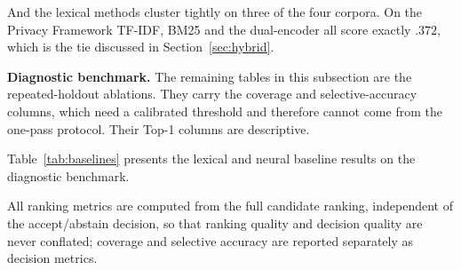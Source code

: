 \documentclass[smallextended,natbib]{svjour3}
\begin{document}
And the lexical methods cluster tightly on three of the four corpora. On the Privacy Framework TF-IDF, BM25 and the dual-encoder all score exactly $.372$, which is the tie discussed in Section~\ref{sec:hybrid}.

\noindent\textbf{Diagnostic benchmark.}
\label{sec:results-synth}
The remaining tables in this subsection are the repeated-holdout ablations. They carry the coverage and selective-accuracy columns, which need a calibrated threshold and therefore cannot come from the one-pass protocol. Their Top-1 columns are descriptive.

Table~\ref{tab:baselines} presents the lexical and neural baseline results on the diagnostic benchmark.

\begin{table}[htbp]
\caption{Baseline comparison on the diagnostic benchmark. Repeated-holdout protocol, mean $\pm$ 95\% CI over 30 seeds, 110 controls, 86 positive links. Descriptive; the cross-corpus ranking claims of Section~\ref{sec:results-multi} use the one-pass protocol instead.}
\label{tab:baselines}
\centering
\setlength{\tabcolsep}{3pt}
\small
{}
\end{table}

All ranking metrics are computed from the full candidate ranking, independent of the accept/abstain decision, so that ranking quality and decision quality are never conflated; coverage and selective accuracy are reported separately as decision metrics.
\end{document}
